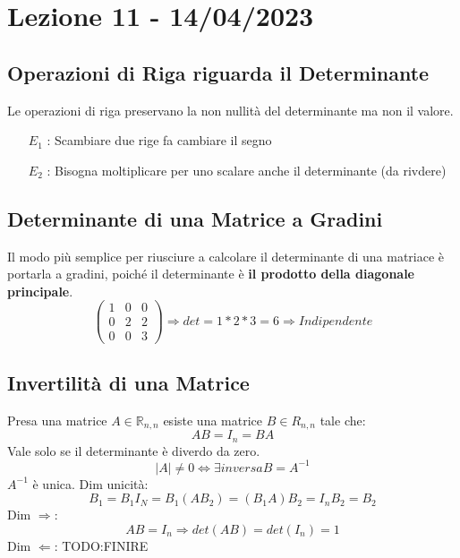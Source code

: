\section{Lezione 11 - 14/04/2023}

\subsection{Operazioni di Riga riguarda il Determinante}
Le operazioni di riga preservano la non nullità del determinante ma non il valore.
\begin{itemize}
\item[$E_1$]: Scambiare due rige fa cambiare il segno
\item[$E_2$]: Bisogna moltiplicare per uno scalare anche il determinante (da rivdere)
\end{itemize}

\subsection{Determinante di una Matrice a Gradini}
Il modo più semplice per riusciure a calcolare il determinante di una matriace è portarla a gradini, poiché il determinante è \textbf{il prodotto della diagonale principale}.\\
$$ 
\begin{pmatrix}
1 & 0 & 0 \\
0 & 2 & 2 \\
0 & 0 & 3
\end{pmatrix} 
\Rightarrow det = 1*2*3 = 6 \Rightarrow Indipendente
$$

\subsection{Invertilità di una Matrice}
Presa una matrice $A \in \mathbb{R}_{n,n}$ esiste una matrice $B \in R_{n,n}$ tale che:
$$ AB = I_n = BA $$
Vale solo se il determinante è diverdo da zero.
$$ |A| \neq 0 \Leftrightarrow \exists inversa B=A^{-1} $$
$A^{-1}$ è unica.
Dim unicità:
$$ B_1=B_1I_N=B_1(AB_2)=(B_1A)B_2=I_nB_2=B_2 $$
Dim $\Rightarrow$:
$$ AB = I_n \Rightarrow det(AB) = det(I_n) = 1 $$
Dim $\Leftarrow$:
TODO:FINIRE

